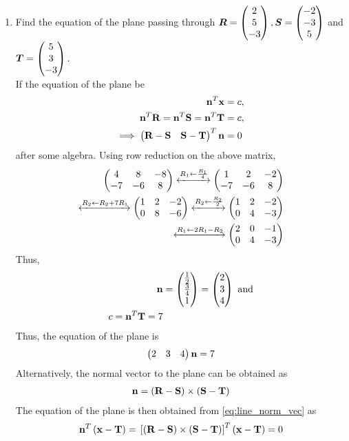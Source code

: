 \documentclass[journal,12pt,twocolumn]{IEEEtran}
\renewcommand\thesection{\arabic{section}}
\begin{document}
\begin{enumerate}[label=\thesection.\arabic*.,ref=\thesection.\theenumi]
\item Find the equation of the plane passing through 
$
\bm{R} = \begin{pmatrix}2\\5\\-3\end{pmatrix},
\bm{S}= \begin{pmatrix}-2\\-3\\5\end{pmatrix}
$ 
and 
$
\bm{T}= \begin{pmatrix}5\\3\\-3\end{pmatrix}.
$
\label{prob:plane_3pts}
\\
\solution  If the equation of the plane be 
\begin{align}
\mathbf{n}^T\mathbf{x} &= c,
\\
\mathbf{n}^T\mathbf{R}=\mathbf{n}^T\mathbf{S}=\mathbf{n}^T\mathbf{T}&= c,
\\
\implies \begin{pmatrix}\mathbf{R}-\mathbf{S} & \mathbf{S}-\mathbf{T}\end{pmatrix}^T\mathbf{n} &= 0
\end{align}
%
after some algebra.
Using row reduction on the above matrix, 
\begin{align}
\begin{pmatrix}4 & 8 &-8 \\ -7  & -6 & 8\end{pmatrix} \xleftrightarrow[]{R_1\leftarrow \frac{R_1}{4}}\begin{pmatrix}1 & 2 &-2 \\ -7  & -6 & 8\end{pmatrix}
\\
\xleftrightarrow[]{R_2\leftarrow R_2 + 7R_1}
\begin{pmatrix}
1 & 2 &-2 
\\ 
0  & 8 & -6
\end{pmatrix}
\xleftrightarrow[]{R_2\leftarrow \frac{R_2}{2}}
\begin{pmatrix}
1 & 2 &-2 
\\ 
0  & 4 & -3
\end{pmatrix}
\\
\xleftrightarrow[]{R_1\leftarrow 2R_1-R_2}
\begin{pmatrix}
2 & 0 &-1 
\\ 
0  & 4 & -3
\end{pmatrix}
\end{align}
%
Thus, 
\begin{align}
\mathbf{n} &= \begin{pmatrix}\frac{1}{2}\\\frac{3}{4}\\1\end{pmatrix} = \begin{pmatrix}2\\3\\4\end{pmatrix} \text{ and}
\\
c = \mathbf{n}^{T}\mathbf{T} = 7
\end{align}
%
Thus, the equation of the plane is 
%
\begin{align}
\begin{pmatrix}2 & 3 & 4\end{pmatrix}\mathbf{n} = 7
\end{align}
%
Alternatively, the normal vector to the plane can be obtained as
%
\begin{align}
\mathbf{n} = \left(\mathbf{R}-\mathbf{S}\right) \times \left(\mathbf{S}-\mathbf{T}\right)
\end{align}
%
The equation of the plane is then obtained from \eqref{eq:line_norm_vec} as 
%
\begin{align}
\label{eq:plane_3pts_cross}
\mathbf{n}^T\left(\mathbf{x}-\mathbf{T}\right) = {}\left[\left(\mathbf{R}-\mathbf{S}\right) \times \left(\mathbf{S}-\mathbf{T}\right)\right]^T\left(\mathbf{x}-\mathbf{T}\right) = 0
\end{align}
%


\end{enumerate}
\end{document}
